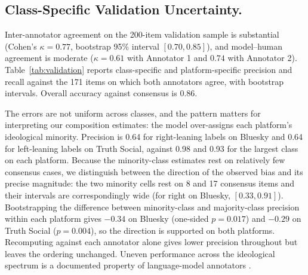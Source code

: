 \documentclass[letterpaper]{article} %
\newcommand{\rev}[1]{{\color{blue}#1}}
\begin{document}
\subsection*{\rev{Class-Specific Validation Uncertainty.}}

\rev{Inter-annotator agreement on the 200-item validation sample is substantial (Cohen's $\kappa = 0.77$, bootstrap 95\% interval $[0.70, 0.85]$), and model--human agreement is moderate ($\kappa = 0.61$ with Annotator 1 and $0.74$ with Annotator 2). Table~\ref{tab:validation} reports class-specific and platform-specific precision and recall against the 171 items on which both annotators agree, with bootstrap intervals. Overall accuracy against consensus is 0.86.}

\rev{The errors are not uniform across classes, and the pattern matters for interpreting our composition estimates: the model over-assigns each platform's ideological minority. Precision is 0.64 for right-leaning labels on Bluesky and 0.64 for left-leaning labels on Truth Social, against 0.98 and 0.93 for the largest class on each platform. Because the minority-class estimates rest on relatively few consensus cases, we distinguish between the direction of the observed bias and its precise magnitude: the two minority cells rest on 8 and 17 consensus items and their intervals are correspondingly wide (for right on Bluesky, $[0.33, 0.91]$). Bootstrapping the difference between minority-class and majority-class precision within each platform gives $-0.34$ on Bluesky (one-sided $p = 0.017$) and $-0.29$ on Truth Social ($p = 0.004$), so the direction is supported on both platforms. Recomputing against each annotator alone gives lower precision throughout but leaves the ordering unchanged. Uneven performance across the ideological spectrum is a documented property of language-model annotators \citep{vallejovera_llms_2025}.}
\end{document}
